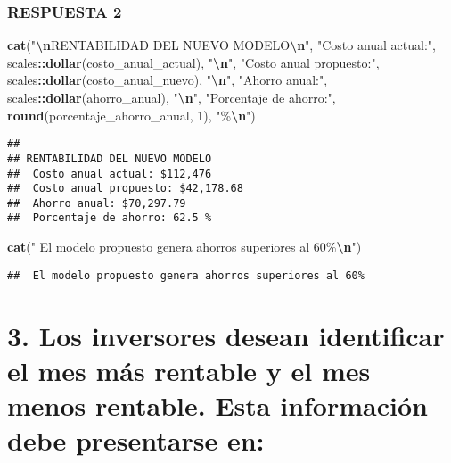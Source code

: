 \documentclass[
]{article}
\newenvironment{Shaded}{\begin{snugshade}}{\end{snugshade}}
\newcommand{\DecValTok}[1]{\textcolor[rgb]{0.00,0.00,0.81}{#1}}
\newcommand{\FunctionTok}[1]{\textcolor[rgb]{0.13,0.29,0.53}{\textbf{#1}}}
\newcommand{\NormalTok}[1]{#1}
\newcommand{\SpecialCharTok}[1]{\textcolor[rgb]{0.81,0.36,0.00}{\textbf{#1}}}
\newcommand{\StringTok}[1]{\textcolor[rgb]{0.31,0.60,0.02}{#1}}
\begin{document}
\subsubsection{RESPUESTA 2}\label{respuesta-2}

\begin{Shaded}
\begin{Highlighting}[]
\FunctionTok{cat}\NormalTok{(}\StringTok{"}\SpecialCharTok{\textbackslash{}n}\StringTok{RENTABILIDAD DEL NUEVO MODELO}\SpecialCharTok{\textbackslash{}n}\StringTok{"}\NormalTok{, }\StringTok{"Costo anual actual:"}\NormalTok{, scales}\SpecialCharTok{::}\FunctionTok{dollar}\NormalTok{(costo\_anual\_actual), }\StringTok{"}\SpecialCharTok{\textbackslash{}n}\StringTok{"}\NormalTok{, }\StringTok{"Costo anual propuesto:"}\NormalTok{, scales}\SpecialCharTok{::}\FunctionTok{dollar}\NormalTok{(costo\_anual\_nuevo), }\StringTok{"}\SpecialCharTok{\textbackslash{}n}\StringTok{"}\NormalTok{, }\StringTok{"Ahorro anual:"}\NormalTok{, scales}\SpecialCharTok{::}\FunctionTok{dollar}\NormalTok{(ahorro\_anual), }\StringTok{"}\SpecialCharTok{\textbackslash{}n}\StringTok{"}\NormalTok{, }\StringTok{"Porcentaje de ahorro:"}\NormalTok{, }\FunctionTok{round}\NormalTok{(porcentaje\_ahorro\_anual, }\DecValTok{1}\NormalTok{), }\StringTok{"\%}\SpecialCharTok{\textbackslash{}n}\StringTok{"}\NormalTok{)}
\end{Highlighting}
\end{Shaded}

\begin{verbatim}
## 
## RENTABILIDAD DEL NUEVO MODELO
##  Costo anual actual: $112,476 
##  Costo anual propuesto: $42,178.68 
##  Ahorro anual: $70,297.79 
##  Porcentaje de ahorro: 62.5 %
\end{verbatim}

\begin{Shaded}
\begin{Highlighting}[]
\FunctionTok{cat}\NormalTok{(}\StringTok{" El modelo propuesto genera ahorros superiores al 60\%}\SpecialCharTok{\textbackslash{}n}\StringTok{"}\NormalTok{)}
\end{Highlighting}
\end{Shaded}

\begin{verbatim}
##  El modelo propuesto genera ahorros superiores al 60%
\end{verbatim}

\section{3. Los inversores desean identificar el mes más rentable y el
mes menos rentable. Esta información debe presentarse
en:}\label{los-inversores-desean-identificar-el-mes-muxe1s-rentable-y-el-mes-menos-rentable.-esta-informaciuxf3n-debe-presentarse-en}
\end{document}
